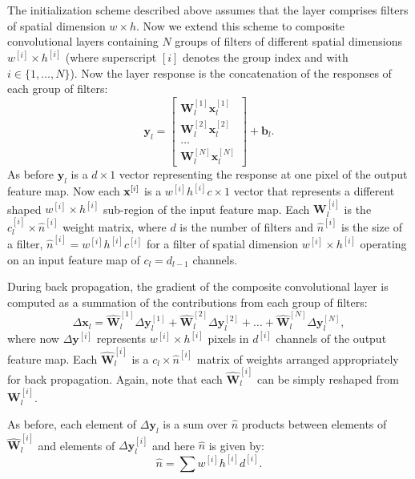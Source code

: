 \documentclass[thesis]{subfiles}
\begin{document}
    The initialization scheme described above assumes that the layer comprises filters of spatial dimension $w \times h$. Now we extend this scheme to composite convolutional layers containing $N$ groups of filters of different spatial dimensions $w^{[i]} \times h^{[i]}$ (where superscript $[i]$ denotes the group index and with $i\in \{1,\dots,N\}$). Now the layer response is the concatenation of the responses of each group of filters:
    \begin{equation}
    \mathbf{y}_l =\begin{bmatrix}\mathbf{W}_l^{[1]} \mathbf{x}_l^{[1]} \\ \mathbf{W}_l^{[2]} \mathbf{x}_l^{[2]} \\ \dots \\ \mathbf{W}_l^{[N]} \mathbf{x}_l^{[N]} \end{bmatrix} + \mathbf{b}_l.
    \end{equation}
    As before $\mathbf{y}_l$ is a $d \times 1$ vector representing the response at one pixel of the output feature map. Now each ${\bf x}^{[i]}$ is a $w^{[i]} h^{[i]} c \times 1$ vector that represents a different shaped $w^{[i]} \times h^{[i]}$ sub-region of the input feature map. Each $\mathbf{W}_l^{[i]}$ is the $c_l^{[i]}\times \hat{n}^{[i]}$ weight matrix, where $d$ is the number of filters and $\hat{n}^{[i]}$ is the size of a filter, \ie $\hat{n}^{[i]} = w^{[i]} h^{[i]} c^{[i]}$ for a filter of spatial dimension $w^{[i]} \times h^{[i]}$ operating on an input feature map of $c_l = d_{l-1}$ channels.
    
    During back propagation, the gradient of the composite convolutional layer is computed as a summation of the contributions from each group of filters:
    \begin{equation}
    \Delta \mathbf{x}_l = \hat{\mathbf{W}}_l^{[1]} \Delta \mathbf{y}_l^{[1]} +  \hat{\mathbf{W}}_l^{[2]} \Delta \mathbf{y}_l^{[2]} + \dots+  \hat{\mathbf{W}}_l^{[N]} \Delta \mathbf{y}_l^{[N]},
    \label{eq:back_prop_gradient_composite}
    \end{equation}
    where now $\Delta \mathbf{y}^{[i]}$ represents $w^{[i]} \times h^{[i]}$ pixels in $d^{[i]}$ channels of the output feature map. Each $\hat{\mathbf{W}}_l^{[i]}$ is a $c_l \times \hat{n}^{[i]}$ matrix of weights arranged appropriately for back propagation. Again, note that each $\hat{\mathbf{W}}_l^{[i]}$ can be simply reshaped from $\mathbf{W}_l^{[i]}$.
    
    As before, each element of $\Delta \mathbf{y}_l$ is a sum over $\hat n$ products between elements of $\hat{\mathbf{W}}^{[i]}_l$ and elements of $\Delta \mathbf{y}^{[i]}_l$ and here $\hat{n}$ is given by:
    \begin{equation}
    \hat{n} = \sum{ w^{[i]} h^{[i]} d^{[i]}}.
    \end{equation}
    
\end{document}
